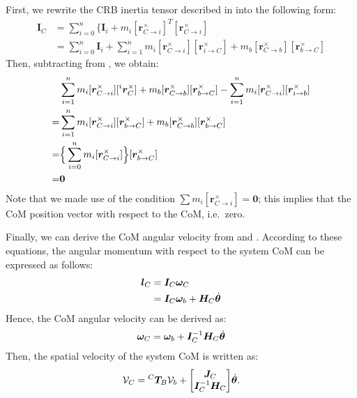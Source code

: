 First, we rewrite the CRB inertia tensor described in  into the following form:
%
\begin{align}
  \bm{I}_{C} &= \sum_{i=0}^{n}\{\bm{I}_{i} + m_{i}[\bm{r}_{C \rightarrow i}^{\times}]^{T}[\bm{r}_{C \rightarrow i}^{\times}]\\
  &= \sum_{i=0}^{n}\bm{I}_{i} + \sum_{i=1}^{n}m_{i}[\bm{r}_{C \rightarrow i}^{\times}][\bm{r}_{i \rightarrow C}^{\times}] +
  m_{b}[\bm{r}_{C \rightarrow b}^{\times}][\bm{r}_{b \rightarrow C}^{\times}]\label{eq:APP_IC2}
\end{align}
%
Then, subtracting  from ,
we obtain:
%
\begin{align}
  &\sum_{i=1}^{n}m_{i}[\bm{r}_{C \rightarrow i}^{\times}][{}^{i}\bm{r}_{C}^{\times}] + m_{b}[\bm{r}_{C \rightarrow b}^{\times}][\bm{r}_{b \rightarrow C}^{\times}]
  - \sum_{i=1}^{n}m_{i}[\bm{r}_{C \rightarrow i}^{\times}][\bm{r}_{i \rightarrow b}^{\times}]\notag\\
  = &\sum_{i=1}^{n}m_{i}[\bm{r}_{C \rightarrow i}^{\times}][\bm{r}_{b \rightarrow C}^{\times}]
  + m_{b}[\bm{r}_{C \rightarrow b}^{\times}][\bm{r}_{b \rightarrow C}^{\times}]\notag\\
  = &\Big\{\sum_{i=0}^{n}m_{i}[\bm{r}_{C \rightarrow i}^{\times}]\Big\}[\bm{r}_{b \rightarrow C}^{\times}] \notag\\
  = &\bm{0}
\end{align}
%
Note that we made use of the condition $\sum m_{i}[\bm{r}_{C \rightarrow i}^{\times}] = \bm{0}$;
this implies that the CoM position vector with respect to the CoM, i.e.\ zero.

Finally, we can derive the CoM angular velocity from  and .
According to these equations, the angular momentum with respect to the system CoM can be expressed as follows:
%
\begin{align}
  \bm{l}_{C} &= \bm{I}_{C}\bm{\omega}_{C}\\
  &= \bm{I}_{C}\bm{\omega}_{b} + \bm{H}_{C}{\dot{\bm{\theta}}}
\end{align}
%
Hence, the CoM angular velocity can be derived as:
%
\begin{align}
  \bm{\omega}_{C} = \bm{\omega}_{b} + \bm{I}_{C}^{-1}\bm{H}_{C}{\dot{\bm{\theta}}}
\end{align}
%
Then, the spatial velocity of the system CoM is written as:
%
\begin{align}
  \mathcal{V}_{C} = {}^{C}\bm{T}_{B}\mathcal{V}_{b} + {\begin{bmatrix} \bm{J}_{C} \\ \bm{I}_{C}^{-1}\bm{H}_{C} \end{bmatrix}}{\dot{\bm{\theta}}}.
\end{align}
%






%
%
